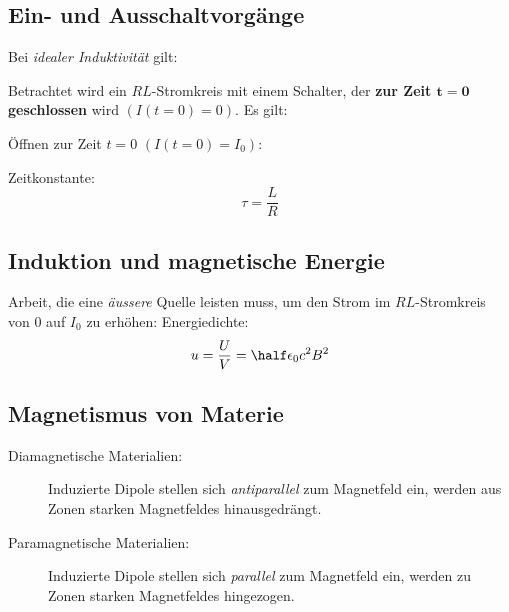 	\subsection{Ein- und Ausschaltvorgänge} %
		Bei \emph{idealer Induktivität} gilt:
		
		
		Betrachtet wird ein $RL$-Stromkreis mit einem Schalter, der
		\textbf{zur Zeit $\boldsymbol{t=0}$ geschlossen} wird $(I(t=0)=0)$.
		Es gilt:
		
		Öffnen zur Zeit $t=0$ $(I(t=0)=I_0)$:
		
		Zeitkonstante:
		\begin{equation*}
			\tau = \frac L R
		\end{equation*}
	\subsection{Induktion und magnetische Energie} %
		Arbeit, die eine \emph{äussere} Quelle leisten muss, um den Strom im
		$RL$-Stromkreis von $0$ auf $I_0$ zu erhöhen:
		Energiedichte:
		\begin{equation*}
			u = \frac U V = \half \epsilon_0 c^2 B^2
		\end{equation*}
	\subsection{Magnetismus von Materie} %
		\begin{description}
			\item[Diamagnetische Materialien:] Induzierte Dipole stellen sich
				\emph{antiparallel} zum Magnetfeld ein, werden aus Zonen starken
				Magnetfeldes hinausgedrängt.
				\item[Paramagnetische Materialien:] Induzierte Dipole stellen sich
					\emph{parallel} zum Magnetfeld ein, werden zu Zonen starken
					Magnetfeldes hingezogen.
		\end{description}
		
